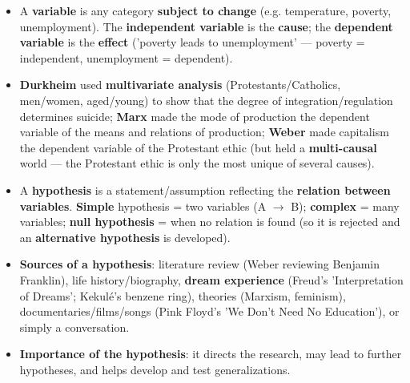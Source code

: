 \begin{KeyConcept}
\begin{itemize}
\item A \textbf{variable} is any category \textbf{subject to change} (e.g. temperature, poverty, unemployment). The \textbf{independent variable} is the \textbf{cause}; the \textbf{dependent variable} is the \textbf{effect} ('poverty leads to unemployment' --- poverty = independent, unemployment = dependent).
\item \textbf{Durkheim} used \textbf{multivariate analysis} (Protestants/Catholics, men/women, aged/young) to show that the degree of integration/regulation determines suicide; \textbf{Marx} made the mode of production the dependent variable of the means and relations of production; \textbf{Weber} made capitalism the dependent variable of the Protestant ethic (but held a \textbf{multi-causal} world --- the Protestant ethic is only the most unique of several causes).
\item A \textbf{hypothesis} is a statement/assumption reflecting the \textbf{relation between variables}. \textbf{Simple} hypothesis = two variables (A $\rightarrow$ B); \textbf{complex} = many variables; \textbf{null hypothesis} = when no relation is found (so it is rejected and an \textbf{alternative hypothesis} is developed).
\item \textbf{Sources of a hypothesis}: literature review (Weber reviewing Benjamin Franklin), life history/biography, \textbf{dream experience} (Freud's 'Interpretation of Dreams'; Kekulé's benzene ring), theories (Marxism, feminism), documentaries/films/songs (Pink Floyd's 'We Don't Need No Education'), or simply a conversation.
\item \textbf{Importance of the hypothesis}: it directs the research, may lead to further hypotheses, and helps develop and test generalizations.
\end{itemize}
\end{KeyConcept}

